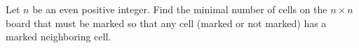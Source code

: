 Let $n$ be an even positive integer.
Find the minimal number of cells on the $n \times n$ board
that must be marked so that any cell
(marked or not marked) has a marked neighboring cell.